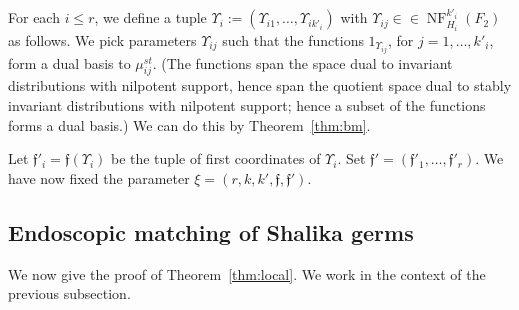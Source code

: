 \documentclass[12pt]{amsart}
\newcommand{\op}[1]{\operatorname{#1}}
\def\NF{\op{NF}}
\def\Y{\Upsilon}
\def\s{{\mathfrak{f}}}
\theoremstyle{plain}
\theoremstyle{definition}
\begin{document}
For each $i\le r$, we define a tuple $\Y_i :=
(\Y_{i1},\ldots,\Y_{ik'_i})$ with $\Y_{ij}\in \in
\NF^{k'_i}_{H_{i}}(F_2)$ as follows.  We pick
parameters $\Y_{ij}$ such that the functions $1_{\Y_{ij}}$, for
$j=1,\ldots,k'_i$, form a dual basis to $\mu_{ij}^{st}$.  (The
functions span the space dual to invariant distributions with
nilpotent support, hence span the quotient space dual to stably
invariant distributions with nilpotent support; hence a subset of the
functions forms a dual basis.)  We can do this by
Theorem~\ref{thm:bm}.

Let $\s'_i = \s(\Y_i)$ be the tuple of first coordinates of $\Y_i$.
Set $\s' = (\s'_1,\ldots,\s'_r)$.  We have now fixed the parameter
$\xi=(r,k,k',\s,\s')$.
 
\subsection{Endoscopic matching of Shalika germs}\label{sec:emsg}

We now give the proof of Theorem~\ref{thm:local}.  We work in the context
of the previous subsection.
\end{document}
